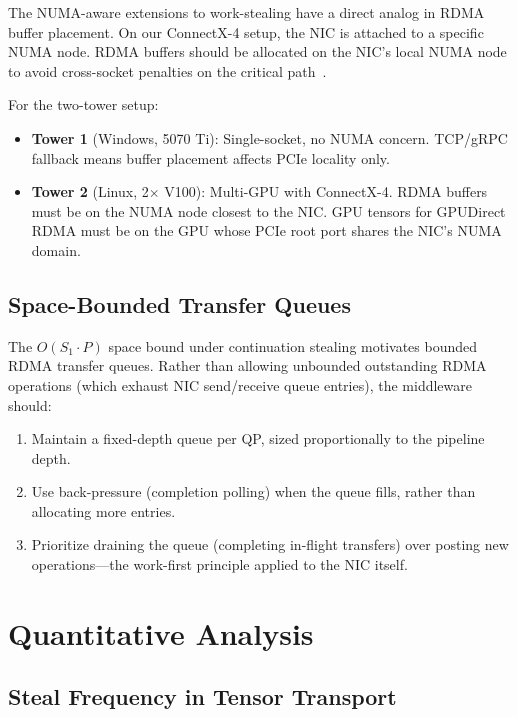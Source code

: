 \documentclass[11pt,letterpaper]{article}
\begin{document}
The NUMA-aware extensions to work-stealing have a direct analog in RDMA buffer placement. On our ConnectX-4 setup, the NIC is attached to a specific NUMA node. RDMA buffers should be allocated on the NIC's local NUMA node to avoid cross-socket penalties on the critical path~\cite{shiina2022continuation}.

For the two-tower setup:
\begin{itemize}
    \item \textbf{Tower 1} (Windows, 5070 Ti): Single-socket, no NUMA concern. TCP/gRPC fallback means buffer placement affects PCIe locality only.
    \item \textbf{Tower 2} (Linux, 2$\times$ V100): Multi-GPU with ConnectX-4. RDMA buffers must be on the NUMA node closest to the NIC. GPU tensors for GPUDirect RDMA must be on the GPU whose PCIe root port shares the NIC's NUMA domain.
\end{itemize}

\subsection{Space-Bounded Transfer Queues}

The $O(S_1 \cdot P)$ space bound under continuation stealing motivates bounded RDMA transfer queues. Rather than allowing unbounded outstanding RDMA operations (which exhaust NIC send/receive queue entries), the middleware should:

\begin{enumerate}
    \item Maintain a fixed-depth queue per QP, sized proportionally to the pipeline depth.
    \item Use back-pressure (completion polling) when the queue fills, rather than allocating more entries.
    \item Prioritize draining the queue (completing in-flight transfers) over posting new operations---the work-first principle applied to the NIC itself.
\end{enumerate}

\section{Quantitative Analysis}
\label{sec:quantitative}

\subsection{Steal Frequency in Tensor Transport}
\end{document}
